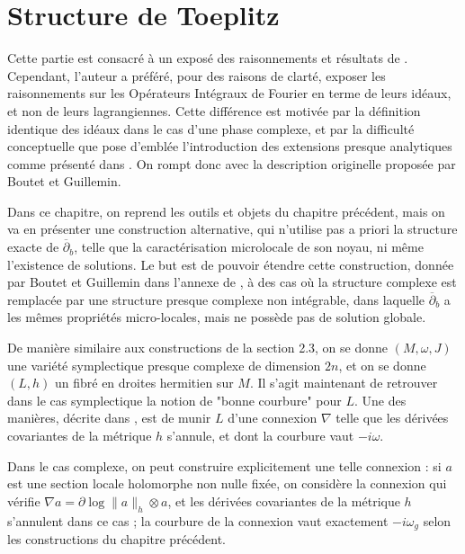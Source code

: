 
\chapter{Structure de Toeplitz}

Cette partie est consacré à un exposé des raisonnements et résultats de \cite{Shiffman2002}. Cependant, l'auteur a préféré, pour des raisons de clarté, exposer les raisonnements sur les Opérateurs Intégraux de Fourier en terme de leurs idéaux, et non de leurs lagrangiennes. Cette différence est motivée par la définition identique des idéaux dans le cas d'une phase complexe, et par la difficulté conceptuelle que pose d'emblée l'introduction des extensions presque analytiques comme présenté dans \cite{melin1975fourier}. On rompt donc avec la description originelle proposée par Boutet et Guillemin.

Dans ce chapitre, on reprend les outils et objets du chapitre précédent, mais on va en présenter une construction alternative, qui n'utilise pas a priori la structure exacte de $\overline{\partial}_b$, telle que la caractérisation microlocale de son noyau, ni même l'existence de solutions. Le but est de pouvoir étendre cette construction, donnée par Boutet et Guillemin dans l'annexe de \cite{BoutetdeMonvel1981}, à des cas où la structure complexe est remplacée par une structure presque complexe non intégrable, dans laquelle $\overline{\partial}_b$ a les mêmes propriétés micro-locales, mais ne possède pas de solution globale.

De manière similaire aux constructions de la section 2.3, on se donne $(M,\omega, J)$ une variété symplectique presque complexe de dimension $2n$, et on se donne $(L,h)$ un fibré en droites hermitien sur $M$. Il s'agit maintenant de retrouver dans le cas symplectique la notion de "bonne courbure" pour $L$. Une des manières, décrite dans \cite{woodhouse1997geometric}, est de munir $L$ d'une connexion $\nabla$ telle que les dérivées covariantes de la métrique $h$ s'annule, et dont la courbure vaut $-i\omega$. 

Dans le cas complexe, on peut construire explicitement une telle
connexion : si $a$ est une section locale holomorphe non nulle fixée,
on considère la connexion qui vérifie $\nabla a = \partial \log
\|a\|_h \otimes a$, et les dérivées covariantes de la métrique $h$
s'annulent dans ce cas ; la courbure de la connexion vaut exactement $-i\omega_g$ selon les constructions du chapitre précédent.

